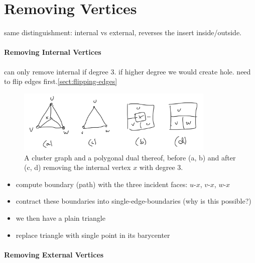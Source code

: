 \section{Removing Vertices}
\label{sect:removing-vertices}

same distinguishment: internal vs external, reverses the insert inside/outside.



\paragraph{Removing Internal Vertices}

can only remove internal if degree 3. if higher degree we would create hole. need to flip edges first.\cref{sect:flipping-edges}

\begin{figure}[H]
	\centering
	\includegraphics[height=30mm]{Resources/RemoveInternalVertex.png}
	\caption{A cluster graph and a polygonal dual thereof, before (a, b) and after (c, d) removing the internal vertex $x$ with degree 3.}
	\label{fig:remove-internal-vertex-example}
\end{figure}

\begin{itemize}
	\item compute boundary (path) with the three incident faces: $u$-$x$, $v$-$x$, $w$-$x$
	\item contract these boundaries into single-edge-boundaries (why is this possible?)
	\item we then have a plain triangle
	\item replace triangle with single point in its barycenter
\end{itemize}




\paragraph{Removing External Vertices}

